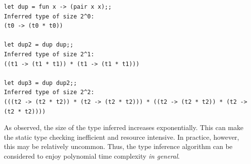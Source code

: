 \footnotesize
\begin{verbatim}
let dup = fun x -> (pair x x);;
Inferred type of size 2^0: 
(t0 -> (t0 * t0))

let dup2 = dup dup;;
Inferred type of size 2^1: 
((t1 -> (t1 * t1)) * (t1 -> (t1 * t1)))

let dup3 = dup dup2;;
Inferred type of size 2^2: 
(((t2 -> (t2 * t2)) * (t2 -> (t2 * t2))) * ((t2 -> (t2 * t2)) * (t2 -> (t2 * t2))))
\end{verbatim}
\normalsize

As observed, the size of the type inferred increases exponentially. This can make the static type checking inefficient and resource intensive. In practice, however, this may be relatively uncommon. Thus, the type inference algorithm can be considered to enjoy polynomial time complexity \textit{in general}.
